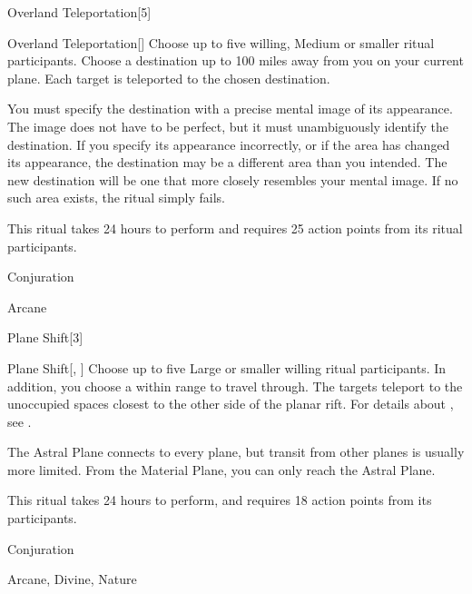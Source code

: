 \begin{spellsection}{Overland Teleportation}[5]


\begin{ability}{Overland Teleportation}[]
Choose up to five willing, Medium or smaller ritual participants.
Choose a destination up to 100 miles away from you on your current plane.
Each target is teleported to the chosen destination.

You must specify the destination with a precise mental image of its appearance.
The image does not have to be perfect, but it must unambiguously identify the destination.
If you specify its appearance incorrectly, or if the area has changed its appearance, the destination may be a different area than you intended.
The new destination will be one that more closely resembles your mental image.
If no such area exists, the ritual simply fails.

This ritual takes 24 hours to perform and requires 25 action points from its ritual participants.
\end{ability}




 Conjuration

 Arcane
\end{spellsection}


\begin{spellsection}{Plane Shift}[3]


\begin{ability}{Plane Shift}[, ]
Choose up to five Large or smaller willing ritual participants.
In addition, you choose a  within \rngmed range to travel through.
The targets teleport to the unoccupied spaces closest to the other side of the planar rift.
For details about , see .

The Astral Plane connects to every plane, but transit from other planes is usually more limited.
From the Material Plane, you can only reach the Astral Plane.

This ritual takes 24 hours to perform, and requires 18 action points from its participants.
\end{ability}




 Conjuration

 Arcane, Divine, Nature
\end{spellsection}


